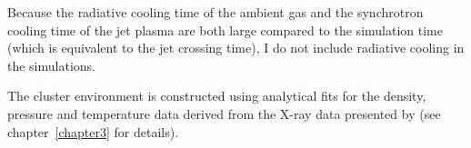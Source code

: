 
Because the radiative cooling time of the ambient gas and the synchrotron cooling time of the jet plasma are both large compared to the simulation time (which is equivalent to the jet crossing time), I do not include radiative cooling in the simulations.

The cluster environment is constructed using analytical fits for the density, pressure and temperature data derived from the X-ray data presented by \citet{david01} (see chapter~\ref{chapter3} for details).


